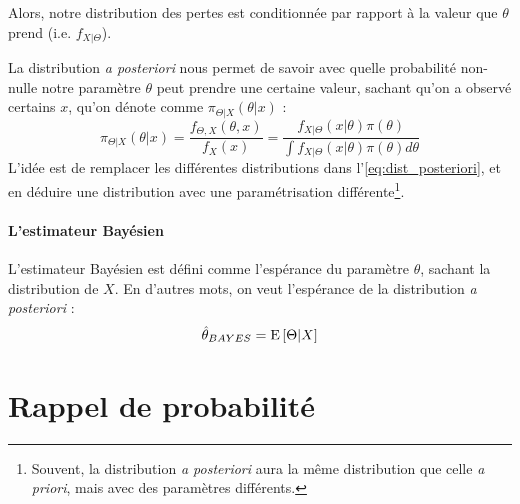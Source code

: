 \documentclass[french, landscape]{article}
\begin{document}
\begin{multicols*}{3}
\begin{definition}
Alors, notre distribution des pertes est conditionnée par rapport à la valeur que $\theta$ prend (i.e. $f_{X|\Theta}$).
\end{definition}


\begin{definition}
La distribution \emph{a posteriori} nous permet de savoir avec quelle probabilité non-nulle notre paramètre $\theta$ peut prendre une certaine valeur, sachant qu'on a observé certains $x$, qu'on dénote comme $\pi_{\Theta | X}(\theta | x)$ : 
\begin{equation}
\label{eq:dist_posteriori}
\pi_{\Theta | X}(\theta | x) = \frac{f_{\Theta, X}(\theta, x)}{f_{X}(x)} = \frac{f_{X|\Theta}(x | \theta) \pi(\theta)}{\int f_{X|\Theta}(x | \theta) \pi(\theta) d \theta} 
\end{equation}
L'idée est de remplacer les différentes distributions dans l'\autoref{eq:dist_posteriori}, et en déduire une distribution avec une paramétrisation différente\footnote{Souvent, la distribution \emph{a posteriori} aura la même distribution que celle \emph{a priori}, mais avec des paramètres différents.}.
\end{definition}

\paragraph{L'estimateur Bayésien} L'estimateur Bayésien est défini comme l'espérance du paramètre $\theta$, sachant la distribution de $X$. En d'autres mots, on veut l'espérance de la distribution \emph{a posteriori} : 
\begin{equation}
\label{eq:estimateur_bayes}
\hat{\theta}_{BAYES} = \mathrm{E} \left[ \Theta | X \right]
\end{equation}

 \section{Rappel de probabilité}

\end{multicols*}
\end{document}
